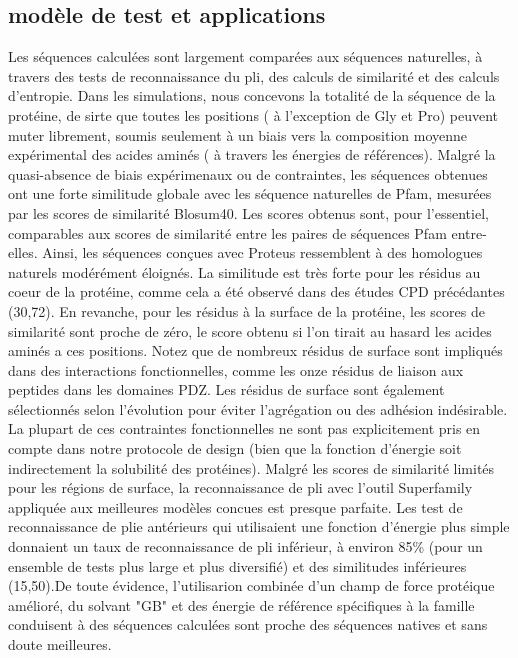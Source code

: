 \begin{enumarete}
\begin{enumerate}
\subsection{modèle de test et applications}

Les séquences calculées sont largement comparées aux séquences naturelles, à travers des tests de reconnaissance du pli, des calculs de similarité et des calculs d'entropie. Dans les simulations, nous concevons la totalité de la séquence de la protéine, de sirte que toutes les positions  ( à l'exception de Gly et Pro) peuvent muter librement, soumis seulement à un biais vers la composition moyenne expérimental des acides aminés ( à travers les énergies de références). Malgré la quasi-absence de biais expérimenaux ou de contraintes, les séquences obtenues ont une forte similitude globale avec les séquence naturelles de Pfam, mesurées par les scores de similarité Blosum40. Les scores obtenus sont, pour l'essentiel, comparables aux scores de similarité entre les paires de séquences Pfam entre-elles.  Ainsi, les séquences conçues avec Proteus ressemblent à des homologues naturels modérément éloignés. La similitude est très forte pour les résidus au coeur de la protéine, comme cela a été observé dans des études CPD précédantes (30,72). En revanche, pour les résidus à la surface de la protéine, les scores de similarité sont proche de zéro, le score obtenu si l'on tirait au hasard les acides aminés a ces positions. Notez que de nombreux résidus de surface sont impliqués dans des interactions fonctionnelles, comme les onze résidus de liaison aux peptides dans les domaines PDZ. Les résidus de surface sont également sélectionnés selon l'évolution pour éviter l'agrégation ou des adhésion indésirable. La plupart de ces contraintes fonctionnelles ne sont pas explicitement pris en compte dans  notre protocole de design (bien que la fonction d'énergie soit indirectement la solubilité des protéines). Malgré les scores de similarité limités pour les régions de surface, la reconnaissance de pli avec l'outil Superfamily  appliquée aux meilleures modèles concues est presque parfaite. Les test de reconnaissance de plie antérieurs qui utilisaient une fonction d'énergie plus simple donnaient un taux de reconnaissance de pli inférieur, à environ 85\% (pour un ensemble de tests plus large et plus diversifié) et des similitudes inférieures (15,50).De toute évidence, l'utilisarion combinée d'un champ de force protéique amélioré, du solvant "GB" et des énergie de référence spécifiques à la famille conduisent à des séquences calculées sont proche des séquences natives et sans doute meilleures.


\end{enumerate}
\end{enumarete}
